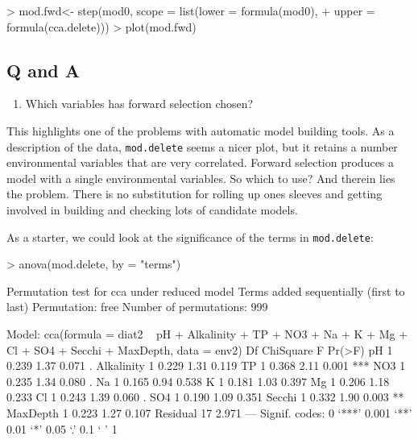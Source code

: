 \documentclass[a4paper,10pt]{article}
\begin{document}
\begin{Schunk}
\begin{Sinput}
> mod.fwd<- step(mod0, scope = list(lower = formula(mod0),
+                    upper = formula(cca.delete)))
> plot(mod.fwd)
\end{Sinput}
\end{Schunk}

\subsection*{Q and A}
\begin{enumerate}
\item Which variables has forward selection chosen?
\end{enumerate}

This highlights one of the problems with automatic model building tools. As a description of the data, \texttt{mod.delete} seems a nicer plot, but it retains a number environmental variables that are very correlated. Forward selection produces a model with a single environmental variables. So which to use? And therein lies the problem. There is no substitution for rolling up ones sleeves and getting involved in building and checking lots of candidate models.

As a starter, we could look at the significance of the terms in \texttt{mod.delete}:

\begin{Schunk}
\begin{Sinput}
> anova(mod.delete, by = "terms")
\end{Sinput}
\begin{Soutput}
Permutation test for cca under reduced model
Terms added sequentially (first to last)
Permutation: free
Number of permutations: 999

Model: cca(formula = diat2 ~ pH + Alkalinity + TP + NO3 + Na + K + Mg + Cl + SO4 + Secchi + MaxDepth, data = env2)
           Df ChiSquare    F Pr(>F)    
pH          1     0.239 1.37  0.071 .  
Alkalinity  1     0.229 1.31  0.119    
TP          1     0.368 2.11  0.001 ***
NO3         1     0.235 1.34  0.080 .  
Na          1     0.165 0.94  0.538    
K           1     0.181 1.03  0.397    
Mg          1     0.206 1.18  0.233    
Cl          1     0.243 1.39  0.060 .  
SO4         1     0.190 1.09  0.351    
Secchi      1     0.332 1.90  0.003 ** 
MaxDepth    1     0.223 1.27  0.107    
Residual   17     2.971                
---
Signif. codes:  0 ‘***’ 0.001 ‘**’ 0.01 ‘*’ 0.05 ‘.’ 0.1 ‘ ’ 1
\end{Soutput}
\end{Schunk}
\end{document}
